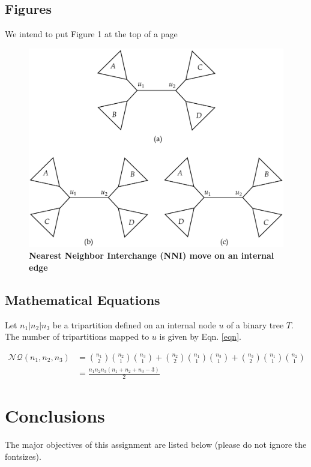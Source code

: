\documentclass[18pt,a4paper]{article}
\begin{document}
\subsection{Figures}
We intend to put Figure 1 at the top of a page

\begin{figure}
	\centering
	\includegraphics[scale = .3 , width = \linewidth]{Figure3.pdf}
	\caption{\textbf{Nearest Neighbor Interchange (NNI) move on an internal edge}}
\end{figure}

\subsection{ Mathematical Equations}

Let $n_1|n_2|n_3$ 
be  a  tripartition  defined  on  an  internal  node
$u$ of  a  binary  tree $T$. 
The number of tripartitions mapped to $u$ is given by Eqn. \ref{eqn}.

\begin{equation}
	\label{eqn}
	\begin{split}
	\mathcal{NQ}(n_1,n_2,n_3) & = \binom{n_1}{2} \binom{n_2}{1}
	\binom{n_3}{1} + \binom{n_2}{2} 
	\binom{n_1}{1} \binom{n_3}{1} + \binom{n_3}{2}
	\binom{n_1}{1} \binom{n_2}{1} \\
	&= \frac{n_1 n_2 n_3 ( n_1 + n_2 + n_3 -3 )}{2}
\end{split}
\end{equation}



\section{Conclusions}
The major objectives of this assignment are listed below 
(please do not ignore the fontsizes).
\end{document}
